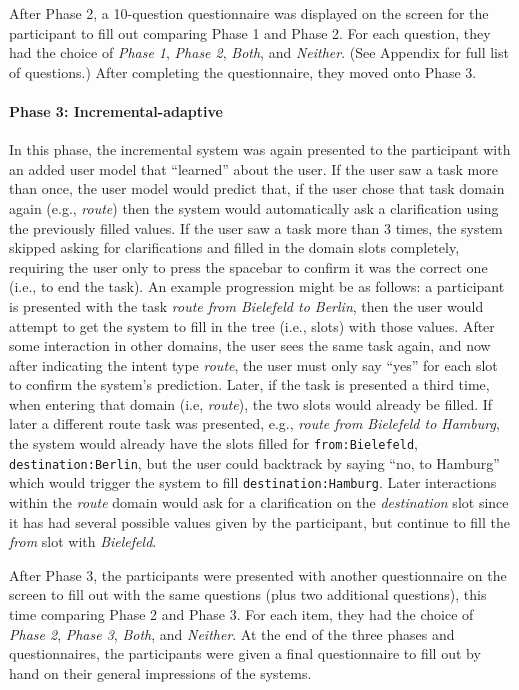 \documentclass[11pt]{article}
\begin{document}
After Phase 2, a 10-question questionnaire was displayed on the screen for the participant to fill out comparing Phase 1 and Phase 2. For each question, they had the choice of \emph{Phase 1}, \emph{Phase 2}, \emph{Both}, and \emph{Neither}. (See Appendix for full list of questions.) After completing the questionnaire, they moved onto Phase 3.

\paragraph{Phase 3: Incremental-adaptive} In this phase, the incremental system was again presented to the participant with an added user model that ``learned'' about the user. If the user saw a task more than once, the user model would predict that, if the user chose that task domain again (e.g., \emph{route}) then the system would automatically ask a clarification using the previously filled values. If the user saw a task more than 3 times, the system skipped asking for clarifications and filled in the domain slots completely, requiring the user only to press the spacebar to confirm it was the correct one (i.e., to end the task). An example progression might be as follows: a participant is presented with the task \emph{route from Bielefeld to Berlin}, then the user would attempt to get the system to fill in the tree (i.e., slots) with those values. After some interaction in other domains, the user sees the same task again, and now after indicating the intent type \emph{route}, the user must only say ``yes'' for each slot to confirm the system's prediction. Later, if the task is presented a third time, when entering that domain (i.e, \emph{route}), the two slots would already be filled. If later a different route task was presented, e.g., \emph{route from Bielefeld to Hamburg}, the system would already have the slots filled for \texttt{from:Bielefeld}, \texttt{destination:Berlin}, but the user could backtrack by saying ``no, to Hamburg'' which would trigger the system to fill \texttt{destination:Hamburg}. Later interactions within the \emph{route} domain would ask for a clarification on the \emph{destination} slot since it has had several possible values given by the participant, but continue to fill the \emph{from} slot with \emph{Bielefeld}.

After Phase 3, the participants were presented with another questionnaire on the screen to fill out with the same questions (plus two additional questions), this time comparing Phase 2 and Phase 3. For each item, they had the choice of \emph{Phase 2}, \emph{Phase 3}, \emph{Both}, and \emph{Neither}. At the end of the three phases and questionnaires, the participants were given a final questionnaire to fill out by hand on their general impressions of the systems. 
\end{document}
